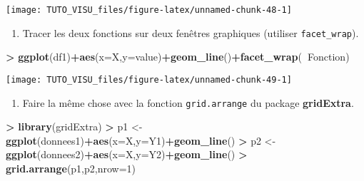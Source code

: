 \documentclass[]{book}
\newenvironment{Shaded}{\begin{snugshade}}{\end{snugshade}}
\newcommand{\DataTypeTok}[1]{\textcolor[rgb]{0.13,0.29,0.53}{#1}}
\newcommand{\DecValTok}[1]{\textcolor[rgb]{0.00,0.00,0.81}{#1}}
\newcommand{\KeywordTok}[1]{\textcolor[rgb]{0.13,0.29,0.53}{\textbf{#1}}}
\newcommand{\NormalTok}[1]{#1}
\newcommand{\OperatorTok}[1]{\textcolor[rgb]{0.81,0.36,0.00}{\textbf{#1}}}
\newcommand{\StringTok}[1]{\textcolor[rgb]{0.31,0.60,0.02}{#1}}
\providecommand{\tightlist}{%
  \setlength{\itemsep}{0pt}\setlength{\parskip}{0pt}}
\theoremstyle{definition}
\theoremstyle{definition}
\theoremstyle{definition}
\theoremstyle{remark}
\begin{document}
\begin{center}\texttt{[image: TUTO\_VISU\_files/figure-latex/unnamed-chunk-48-1]} \end{center}

\begin{enumerate}
\def\labelenumi{\arabic{enumi}.}
\setcounter{enumi}{3}
\tightlist
\item
  Tracer les deux fonctions sur deux fenêtres graphiques (utiliser \texttt{facet\_wrap}).
\end{enumerate}

\begin{Shaded}
\begin{Highlighting}[]
\OperatorTok{>}\StringTok{ }\KeywordTok{ggplot}\NormalTok{(df1)}\OperatorTok{+}\KeywordTok{aes}\NormalTok{(}\DataTypeTok{x=}\NormalTok{X,}\DataTypeTok{y=}\NormalTok{value)}\OperatorTok{+}\KeywordTok{geom_line}\NormalTok{()}\OperatorTok{+}\KeywordTok{facet_wrap}\NormalTok{(}\OperatorTok{~}\NormalTok{Fonction)}
\end{Highlighting}
\end{Shaded}

\begin{center}\texttt{[image: TUTO\_VISU\_files/figure-latex/unnamed-chunk-49-1]} \end{center}

\begin{enumerate}
\def\labelenumi{\arabic{enumi}.}
\setcounter{enumi}{4}
\tightlist
\item
  Faire la même chose avec la fonction \texttt{grid.arrange} du package \textbf{gridExtra}.
\end{enumerate}

\begin{Shaded}
\begin{Highlighting}[]
\OperatorTok{>}\StringTok{ }\KeywordTok{library}\NormalTok{(gridExtra)}
\OperatorTok{>}\StringTok{ }\NormalTok{p1 <-}\StringTok{ }\KeywordTok{ggplot}\NormalTok{(donnees1)}\OperatorTok{+}\KeywordTok{aes}\NormalTok{(}\DataTypeTok{x=}\NormalTok{X,}\DataTypeTok{y=}\NormalTok{Y1)}\OperatorTok{+}\KeywordTok{geom_line}\NormalTok{()}
\OperatorTok{>}\StringTok{ }\NormalTok{p2 <-}\StringTok{ }\KeywordTok{ggplot}\NormalTok{(donnees2)}\OperatorTok{+}\KeywordTok{aes}\NormalTok{(}\DataTypeTok{x=}\NormalTok{X,}\DataTypeTok{y=}\NormalTok{Y2)}\OperatorTok{+}\KeywordTok{geom_line}\NormalTok{()}
\OperatorTok{>}\StringTok{ }\KeywordTok{grid.arrange}\NormalTok{(p1,p2,}\DataTypeTok{nrow=}\DecValTok{1}\NormalTok{)}
\end{Highlighting}
\end{Shaded}
\end{document}

